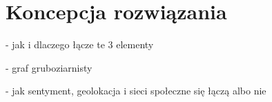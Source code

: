 \chapter{Koncepcja rozwiązania}
- jak i dlaczego łącze te 3 elementy

- graf gruboziarnisty

- jak sentyment, geolokacja i sieci społeczne się łączą albo nie